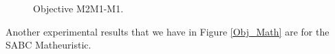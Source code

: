 \begin{figure}[H]
\hspace{0.4cm}%
\vspace{0.4cm}
\caption{Objective M2M1-M1.}
\label{Obj_M2M1-M1}
\end{figure}

Another experimental results that we have in Figure \ref{Obj_Math} are for the SABC Matheuristic.

